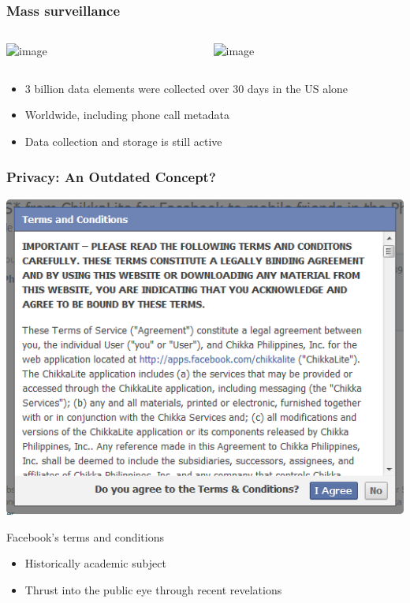 \documentclass[12pt]{beamer}
\begin{document}
\begin{frame}
\frametitle{Mass surveillance}
\begin{columns}
\begin{column}{0.5\textwidth}
\begin{center}
\includegraphics<2->[scale=0.1]{snowden.jpg}
\break
{}
\end{center}
\end{column}
\begin{column}{0.5\textwidth}
\begin{center}
\includegraphics<2->[scale=0.2]{BoundlessInformant.PNG}
\break
{}
\end{center}
\end{column}
\end{columns}
\begin{itemize}
\item<3-> 3 billion data elements were collected over 30 days in the US alone
\item<3-> Worldwide, including phone call metadata
\item<3-> Data collection and storage is still active
\end{itemize}
\end{frame}

\begin{frame}
\frametitle{Privacy: An Outdated Concept?}
\begin{center}
\includegraphics[scale=0.3]{termsandconditions.png}
\break
\caption{Facebook's terms and conditions\cite{fbterms}}
\end{center}
\begin{itemize}
\item<2-> Historically academic subject
\item<2-> Thrust into the public eye through recent revelations
\end{itemize}
\end{frame}
\end{document}
